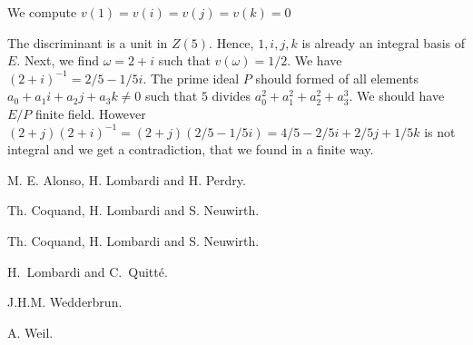 \documentclass[10pt,a4paper]{article}
\begin{document}
 We compute $v(1) = v(i) = v(j) = v(k) = 0$ 

 The discriminant is a unit in $Z(5)$. Hence, $1,i,j,k$ is already an integral basis of $E$.
 Next, we find $\omega = 2+i$ such that $v(\omega) = 1/2$. We have $(2+i)^{-1} = 2/5 -1/5i$.
 The prime ideal $P$ should formed of all
 elements $a_0 + a_1i+a_2j+a_3k\neq 0$ such that $5$ divides $a_0^2 + a_1^2 + a_2^2 + a_3^3$.
 We should have $E/P$ finite field. However $(2+j)(2+i)^{-1} = (2+j)(2/5-1/5i) = 4/5 -2/5i + 2/5j +1/5k$
 is not integral and we get a contradiction, that we found in a finite way.

  \begin{thebibliography}{9}

    M. E. Alonso, H. Lombardi and H. Perdry.

    Th. Coquand, H. Lombardi and S. Neuwirth.

    Th. Coquand, H. Lombardi and S. Neuwirth.

    H.\ Lombardi and C.\ Quitté.
    
    J.H.M. Wedderbrun.

    A. Weil.
    
    


 \end{thebibliography}
\end{document}
